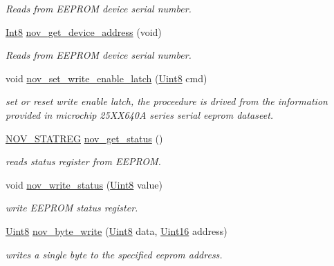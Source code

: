 \begin{DoxyCompactItemize}
\begin{DoxyCompactList}\small\item\em Reads from E\+E\+P\+R\+O\+M device serial number. \end{DoxyCompactList}\item 
\hyperlink{a00072_a7e31ca7716b8d85dd473450a5c5e5a97}{Int8} \hyperlink{a00060_a1a59d5ac1c5e9a022c19d8c333bf3b60}{nov\+\_\+get\+\_\+device\+\_\+address} (void)
\begin{DoxyCompactList}\small\item\em Reads from E\+E\+P\+R\+O\+M device serial number. \end{DoxyCompactList}\item 
void \hyperlink{a00060_a7b698f4b0088c4e28951c2204b7b821e}{nov\+\_\+set\+\_\+write\+\_\+enable\+\_\+latch} (\hyperlink{a00072_af84840501dec18061d18a68c162a8fa2}{Uint8} cmd)
\begin{DoxyCompactList}\small\item\em set or reset write enable latch, the proceedure is drived from the information provided in microchip 25\+X\+X640\+A series serial eeprom dataseet. \end{DoxyCompactList}\item 
\hyperlink{a00029_d0/d1c/a00605}{N\+O\+V\+\_\+\+S\+T\+A\+T\+R\+E\+G} \hyperlink{a00060_af9ccbc198ed63feb4fd6c18dd934590d}{nov\+\_\+get\+\_\+status} ()
\begin{DoxyCompactList}\small\item\em reads status register from E\+E\+P\+R\+O\+M. \end{DoxyCompactList}\item 
void \hyperlink{a00060_a495e93d64734be469f6725de24dd44e1}{nov\+\_\+write\+\_\+status} (\hyperlink{a00072_af84840501dec18061d18a68c162a8fa2}{Uint8} value)
\begin{DoxyCompactList}\small\item\em write E\+E\+P\+R\+O\+M status register. \end{DoxyCompactList}\item 
\hyperlink{a00072_af84840501dec18061d18a68c162a8fa2}{Uint8} \hyperlink{a00060_a3f47e1f5179297e173ae8508c7185632}{nov\+\_\+byte\+\_\+write} (\hyperlink{a00072_af84840501dec18061d18a68c162a8fa2}{Uint8} data, \hyperlink{a00072_a59a9f6be4562c327cbfb4f7e8e18f08b}{Uint16} address)
\begin{DoxyCompactList}\small\item\em writes a single byte to the specified eeprom address. \end{DoxyCompactList}\item 

\end{DoxyCompactItemize}

